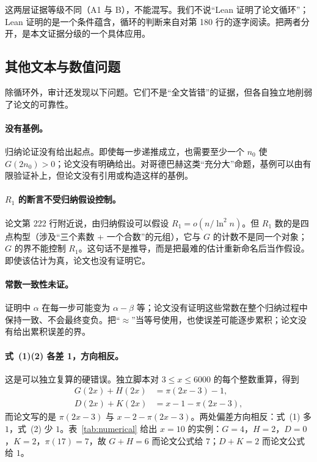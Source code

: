 \documentclass[11pt,a4paper]{ctexart}
\theoremstyle{plain}
\theoremstyle{definition}
\begin{document}
这两层证据等级不同（A1 与 B），不能混写。我们不说“Lean 证明了论文循环”；Lean 证明的是一个条件蕴含，循环的判断来自对第 180 行的逐字阅读。把两者分开，是本文证据分级的一个具体应用。

\subsection{其他文本与数值问题}
\label{sec:paper-other}

除循环外，审计还发现以下问题。它们不是“全文皆错”的证据，但各自独立地削弱了论文的可靠性。

\paragraph{没有基例。}
归纳论证没有给出起点。即使每一步递推成立，也需要至少一个 $n_0$ 使 $G(2n_0)>0$；论文没有明确给出。对哥德巴赫这类“充分大”命题，基例可以由有限验证补上，但论文没有引用或构造这样的基例。

\paragraph{$R_1$ 的断言不受归纳假设控制。}
论文第 222 行附近说，由归纳假设可以假设 $R_1=o(n/\ln^2 n)$。但 $R_1$ 数的是四点构型（涉及“三个素数 + 一个合数”的元组），它与 $G$ 的计数不是同一个对象；$G$ 的界不能控制 $R_1$。这句话不是推导，而是把最难的估计重新命名后当作假设。即使该估计为真，论文也没有证明它。

\paragraph{常数一致性未证。}
证明中 $\alpha$ 在每一步可能变为 $\alpha-\beta$ 等；论文没有证明这些常数在整个归纳过程中保持一致、不会最终变负。把“$\approx$”当等号使用，也使误差可能逐步累积；论文没有给出累积误差的界。

\paragraph{式~(1)(2) 各差 1，方向相反。}
这是可以独立复算的硬错误。独立脚本对 $3\le x\le6000$ 的每个整数重算，得到
\begin{align}
G(2x)+H(2x)&=\pi(2x-3)-1, \label{eq:true1}\\
D(2x)+K(2x)&=x-1-\pi(2x-3), \label{eq:true2}
\end{align}
而论文写的是 $\pi(2x-3)$ 与 $x-2-\pi(2x-3)$。两处偏差方向相反：式~(1) 多 $1$，式~(2) 少 $1$。表~\ref{tab:numerical} 给出 $x=10$ 的实例：$G=4$，$H=2$，$D=0$，$K=2$，$\pi(17)=7$，故 $G+H=6$ 而论文公式给 $7$；$D+K=2$ 而论文公式给 $1$。
\end{document}
